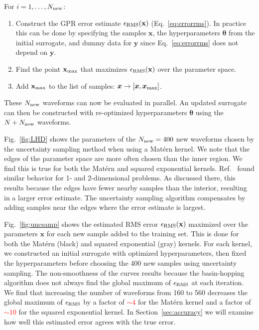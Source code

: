 \documentclass[prd,aps,letter,twocolumn,floatfix,notitlepage,nofootinbib]{revtex4-1}
\def\bx{\mathbf{x}}
\def\by{\mathbf{y}}
\def\btheta{\boldsymbol{\theta}}
\newcommand{\red}[1]{\textcolor{red}{#1}}
\begin{document}
For $i = 1, \dots, N_{\rm new}$:
\begin{enumerate}

\item Construct the GPR error estimate $\epsilon_{\rm RMS}(\bx)$ (Eq.~\eqref{eq:errorrms}). In practice this can be done by specifying the samples $\bx$, the hyperparameters $\btheta$ from the initial surrogate, and dummy data for $\by$ since Eq.~\eqref{eq:errorrms} does not depend on $\by$.

\item Find the point $\bx_{\rm max}$ that maximizes $\epsilon_{\rm RMS}(\bx)$ over the parameter space. 

\item Add $\bx_{\rm max}$ to the list of samples: ${\bm x} \to [{\bm x}, {\bm x}_{\rm max}]$.

\end{enumerate}
These $N_{\rm new}$ waveforms can now be evaluated in parallel. An updated surrogate can then be constructed with re-optimized hyperparameters $\btheta$ using the $N + N_{\rm new}$ waveforms.

Fig.~\ref{fig:LHD} shows the parameters of the $N_{\rm new}=400$ new waveforms chosen by the uncertainty sampling method when using a Mat\'{e}rn kernel. We note that the edges of the parameter space are more often chosen than the inner region. We find this is true for both the Mat\'{e}rn and squared exponential kernels. Ref.~\cite{DoctorFarrHolz2017} found similar behavior for 1- and 2-dimensional problems. As discussed there, this results because the edges have fewer nearby samples than the interior, resulting in a larger error estimate. The uncertainty sampling algorithm compensates by adding samples near the edges where the error estimate is largest.

Fig.~\ref{fig:uncsamp} shows the estimated RMS error $\epsilon_{\rm RMS}(\bx)$ maximized over the parameters $\bx$ for each new sample added to the training set. This is done for both the Mat\'{e}rn (black) and squared exponential (gray) kernels. For each kernel, we constructed an initial surrogate with optimized hyperparameters, then fixed the hyperparameters before choosing the 400 new samples using uncertainty sampling. The non-smoothness of the curves results because the basin-hopping algorithm does not always find the global maximum of $\epsilon_{\rm RMS}$ at each iteration. We find that increasing the number of waveforms from 160 to 560 decreases the global maximum of $\epsilon_{\rm RMS}$ by a factor of \red{$\sim 4$} for the Mat\'{e}rn kernel and a factor of \red{$\sim 10$} for the squared exponential kernel. In Section~\ref{sec:accuracy} we will examine how well this estimated error agrees with the true error.
\end{document}
